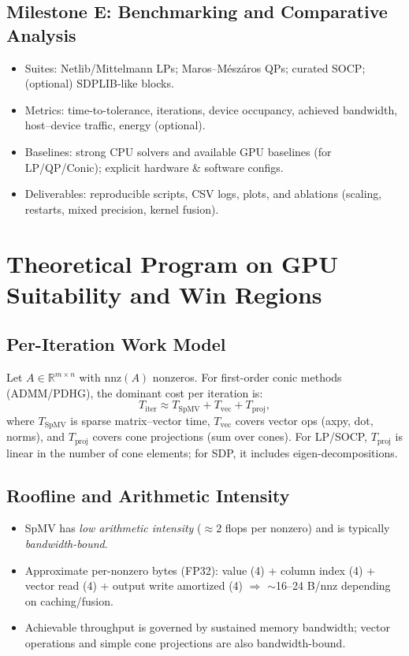 \documentclass[12pt]{article}
\begin{document}
\subsection*{Milestone E: Benchmarking and Comparative Analysis}
\begin{itemize}
  \item Suites: Netlib/Mittelmann LPs; Maros--Mészáros QPs; curated SOCP; (optional) SDPLIB-like blocks.
  \item Metrics: time-to-tolerance, iterations, device occupancy, achieved bandwidth, host--device traffic, energy (optional).
  \item Baselines: strong CPU solvers and available GPU baselines (for LP/QP/Conic); explicit hardware \& software configs.
  \item Deliverables: reproducible scripts, CSV logs, plots, and ablations (scaling, restarts, mixed precision, kernel fusion).
\end{itemize}

\section*{Theoretical Program on GPU Suitability and Win Regions}

\subsection*{Per-Iteration Work Model}
Let $A \in \mathbb{R}^{m \times n}$ with $\mathrm{nnz}(A)$ nonzeros. For first-order conic methods (ADMM/PDHG), the dominant cost per iteration is:
\[
T_{\text{iter}} \approx T_{\text{SpMV}} + T_{\text{vec}} + T_{\text{proj}},
\]
where $T_{\text{SpMV}}$ is sparse matrix--vector time, $T_{\text{vec}}$ covers vector ops (axpy, dot, norms), and $T_{\text{proj}}$ covers cone projections (sum over cones). For LP/SOCP, $T_{\text{proj}}$ is linear in the number of cone elements; for SDP, it includes eigen-decompositions.

\subsection*{Roofline and Arithmetic Intensity}
\begin{itemize}
  \item SpMV has \emph{low arithmetic intensity} ($\approx 2$ flops per nonzero) and is typically \emph{bandwidth-bound}. 
  \item Approximate per-nonzero bytes (FP32): value (4) + column index (4) + vector read (4) + output write amortized (4) $\Rightarrow$ $\sim$16--24 B/nnz depending on caching/fusion. 
  \item Achievable throughput is governed by sustained memory bandwidth; vector operations and simple cone projections are also bandwidth-bound.
\end{itemize}
\end{document}
